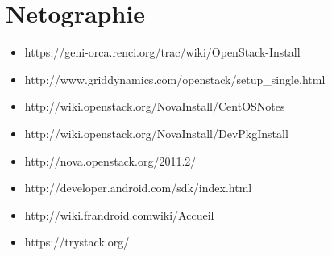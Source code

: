 \chapter{Netographie}

\begin{itemize}
 
  \item https://geni-orca.renci.org/trac/wiki/OpenStack-Install
  \item http://www.griddynamics.com/openstack/setup\_single.html
 \item http://wiki.openstack.org/NovaInstall/CentOSNotes
 \item http://wiki.openstack.org/NovaInstall/DevPkgInstall
 \item http://nova.openstack.org/2011.2/
 \item http://developer.android.com/sdk/index.html
 \item http://wiki.frandroid.com\/wiki/Accueil
 \item https://trystack.org/
\end{itemize}
